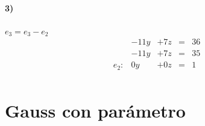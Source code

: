 \documentclass[palatino,nosec,nochap]{Docencia}
\begin{document}
\begin{problem}
\paragraph{3)} $e_3=e_3-e_2$
\[
\begin{array}{lcccl}
&-11y&+7z&=&36\\
&-11y&+7z&=&35\\
\hline
e_2:   & 0y&+0z&=&1\\
\end{array}
\]	



\end{problem}



\newpage
\section{Gauss con parámetro}
\end{document}
